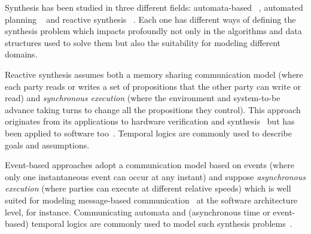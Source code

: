 Synthesis has been studied in three different fields: automata-based 
~\cite{allen1997formal, maggee1999concurrency, DBLP:journals/cacm/Hoare78, ramadge:1989, ClassicalMindBook}, automated planning ~\cite{fikes1971strips,penberthy1992ucpop} and reactive synthesis ~\cite{harel1985development,pnueli1985transition}.  Each one has different ways of defining the synthesis problem 
which impacts profoundly not only in the algorithms and data structures used to solve 
them but also the suitability for modeling different domains. 

Reactive synthesis assumes both a memory sharing communication model (where each party reads 
or writes a set of propositions that the other party can write or read) and 
\textit{synchronous execution} (where the environment and system-to-be advance 
taking turns to change all the propositions they control). This approach 
originates from its applications to hardware verification and synthesis~\cite{DBLP:conf/popl/PnueliR89} but has 
been applied to software too~\cite{manna1980deductive}. Temporal logics 
are commonly used to describe goals and assumptions. 

Event-based approaches adopt a communication model based on events (where only one 
instantaneous event can occur at any instant) and suppose \textit{asynchronous execution} (where parties can execute at 
different relative speeds) which is well suited for modeling message-based 
communication~\cite{DBLP:journals/cacm/Hoare78, Milner:1982} at the software architecture level, for instance. 
Communicating automata  and (asynchronous time or event-based) temporal logics are commonly used 
to model such synthesis problems~\cite{ramadge:1989}. 

